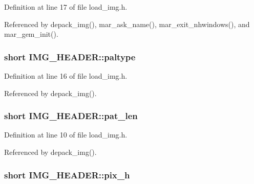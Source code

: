 Definition at line 17 of file load\+\_\+img.\+h.



Referenced by depack\+\_\+img(), mar\+\_\+ask\+\_\+name(), mar\+\_\+exit\+\_\+nhwindows(), and mar\+\_\+gem\+\_\+init().

\hypertarget{structIMG__HEADER_a7670a47b02ace635063baec09703a7ed}{
\subsubsection[{paltype}]{\setlength{\rightskip}{0pt plus 5cm}short I\+M\+G\+\_\+\+H\+E\+A\+D\+E\+R\+::paltype}}\label{structIMG__HEADER_a7670a47b02ace635063baec09703a7ed}


Definition at line 16 of file load\+\_\+img.\+h.



Referenced by depack\+\_\+img().

\hypertarget{structIMG__HEADER_a93e811df0ab124abb41aca253725e620}{
\subsubsection[{pat\+\_\+len}]{\setlength{\rightskip}{0pt plus 5cm}short I\+M\+G\+\_\+\+H\+E\+A\+D\+E\+R\+::pat\+\_\+len}}\label{structIMG__HEADER_a93e811df0ab124abb41aca253725e620}


Definition at line 10 of file load\+\_\+img.\+h.



Referenced by depack\+\_\+img().

\hypertarget{structIMG__HEADER_a402dd152d2d3c8e41a69708a2d2eec7b}{
\subsubsection[{pix\+\_\+h}]{\setlength{\rightskip}{0pt plus 5cm}short I\+M\+G\+\_\+\+H\+E\+A\+D\+E\+R\+::pix\+\_\+h}}\label{structIMG__HEADER_a402dd152d2d3c8e41a69708a2d2eec7b}


